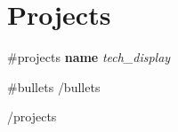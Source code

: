 \vspace{-8pt}
\section{Projects}
\resumeSubHeadingListStart
{{#projects}}
    \resumeProjectHeading
    {\textbf{ {{{name}}} } \textbullet{} \textit{ {{{tech_display}}} }}{}
    \begin{itemize}
{{#bullets}}
{{/bullets}}
    \end{itemize}
{{/projects}}
\resumeSubHeadingListEnd
